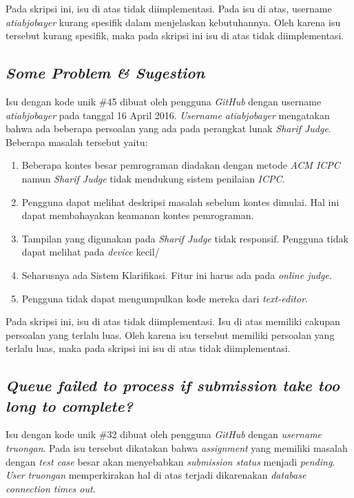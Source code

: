 Pada skripsi ini, isu di atas tidak diimplementasi. Pada isu di atas, username \textit{atiabjobayer} kurang spesifik dalam menjelaskan kebutuhannya. Oleh karena isu tersebut kurang spesifik, maka pada skripsi ini isu di atas tidak diimplementasi.

\subsection{\textit{Some Problem \& Sugestion}}
Isu dengan kode unik \#45 dibuat oleh pengguna \textit{GitHub} dengan username \textit{atiabjobayer} pada tanggal 16 April 2016. \textit{Username} \textit{atiabjobayer} mengatakan bahwa ada beberapa persoalan yang ada pada perangkat lunak \textit{Sharif Judge}. Beberapa masalah tersebut yaitu:
	\begin{enumerate}
		\item Beberapa kontes besar pemrograman diadakan dengan metode \textit{ACM ICPC} namun \textit{Sharif Judge} tidak mendukung sistem penilaian \textit{ICPC}.
		\item Pengguna dapat melihat deskripsi masalah sebelum kontes dimulai. Hal ini dapat membahayakan keamanan kontes pemrograman.
		\item Tampilan yang digunakan pada \textit{Sharif Judge} tidak responsif. Pengguna tidak dapat melihat pada \textit{device} kecil/
		\item Seharusnya ada Sistem Klarifikasi. Fitur ini harus ada pada \textit{online judge}.
		\item Pengguna tidak dapat mengumpulkan kode mereka dari \textit{text-editor}.
	\end{enumerate}

Pada skripsi ini, isu di atas tidak diimplementasi. Isu di atas memiliki cakupan persoalan yang terlalu luas. Oleh karena isu tersebut memiliki persoalan yang terlalu luas, maka pada skripsi ini isu di atas tidak diimplementasi.
	
\subsection{\textit{Queue failed to process if submission take too long to complete?}}
Isu dengan kode unik \#32 dibuat oleh pengguna \textit{GitHub} dengan \textit{username} \textit{truongan}. Pada isu tersebut dikatakan bahwa \textit{assignment} yang memiliki masalah dengan \textit{test case} besar akan menyebabkan \textit{submission status} menjadi \textit{pending}. \textit{User} \textit{truongan} memperkirakan hal di atas terjadi dikarenakan \textit{database connection times out}. 

